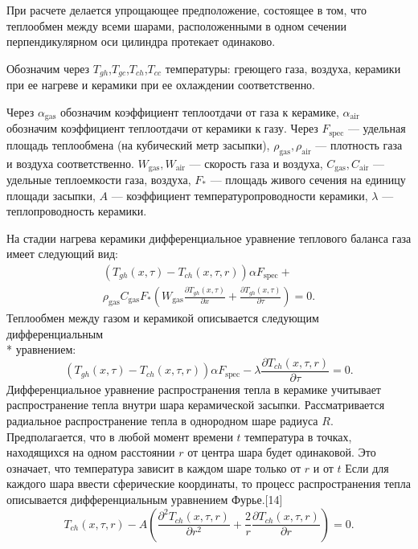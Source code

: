 \documentclass[a4paper,12pt]{article}
\begin{document}
При расчете делается упрощающее предположение, состоящее в том, что
теплообмен между всеми шарами, расположенными в одном сечении
перпендикулярном оси цилиндра протекает одинаково.

Обозначим через $T_{gh}$,$T_{gc}$,$T_{ch}$,$T_{cc}$ температуры: греющего
газа, воздуха, керамики при ее нагреве и керамики при ее охлаждении
соответственно.

Через $\alpha_{\text{gas}}$ обозначим коэффициент теплоотдачи от газа к
керамике, $\alpha_{\text{air}}$ обозначим коэффициент теплоотдачи от
керамики к газу. Через $F_{\text{spec}}$  --- удельная площадь теплообмена
(на кубический метр
засыпки), $\rho_{\text{gas}}, \rho_{\text{air}}$ --- плотность газа и воздуха
соответственно. $W_{\text{gas}},W_{\text{air}}$ --- скорость газа и
воздуха, $C_{\text{gas}},C_{\text{air}}$ --- удельные теплоемкости газа,
воздуха, $F_{*}$ --- площадь живого сечения
на единицу площади засыпки, $A$ --- коэффициент температуропроводности керамики,
$\lambda$ --- теплопроводность керамики.

На стадии нагрева керамики дифференциальное уравнение теплового баланса
газа имеет следующий вид:
\begin{equation}
    \begin{array}{ll}
        \left( T_{gh}(x,\tau) - T_{ch}(x,\tau,r) \right) \alpha F_{\text{spec}}+\\
        \rho_{\text{gas}} C_{\text{gas}} F_{*}
        \left( W_{\text{gas}} \frac{\partial T_{gh} (x, \tau)}{\partial x} + 
        \frac{\partial T_{gh} (x, \tau)}{\partial \tau} \right) = 0.
    \end{array}
    \label{gasheat}
\end{equation}
Теплообмен между газом и керамикой описывается следующим дифференциальным
\\* уравнением: 
\begin{equation}
    \left( T_{gh}(x,\tau) - T_{ch}(x,\tau,r) \right) \alpha F_{\text{spec}}-
    \lambda \frac{\partial T_{ch} (x, \tau, r)}{\partial \tau} = 0.
    \label{surfheat}
\end{equation}
Дифференциальное уравнение распространения тепла в керамике учитывает
распространение тепла внутри шара керамической засыпки. Рассматривается
радиальное распространение тепла в однородном шаре радиуса $R$.
Предполагается, что в любой момент времени $t$ температура в точках,
находящихся на одном расстоянии $r$ от центра шара будет одинаковой. Это
означает, что температура зависит в каждом шаре только от $r$ и от $t$ Если
для каждого шара ввести сферические координаты, то процесс распространения
тепла описывается дифференциальным уравнением Фурье.[14]
\begin{equation}
    T_{ch}(x,\tau,r) - A \left( 
    \frac{ \partial^2 T_{ch}(x,\tau,r)}{\partial r^2} +
    \frac{2}{r} \frac{ \partial T_{ch}(x,\tau,r)}{\partial r} \right) = 0.
    \label{cerheat}
\end{equation}
\end{document}
